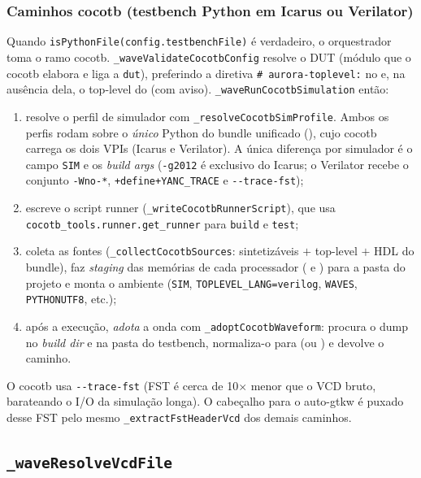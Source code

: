 \subsubsection{Caminhos cocotb (testbench Python em Icarus ou Verilator)}

Quando \lstinline|isPythonFile(config.testbenchFile)| é verdadeiro, o
orquestrador toma o ramo cocotb. \lstinline|_waveValidateCocotbConfig| resolve o
DUT (módulo que o cocotb elabora e liga a \lstinline|dut|), preferindo a
diretiva \lstinline|# aurora-toplevel:| no  e, na ausência dela, o
top-level do  (com aviso). \lstinline|_waveRunCocotbSimulation|
então:

\begin{enumerate}[leftmargin=*]
  \item resolve o perfil de simulador com \lstinline|_resolveCocotbSimProfile|.
    Ambos os perfis rodam sobre o \emph{único} Python do bundle unificado
    (), cujo cocotb carrega
    os dois VPIs (Icarus e Verilator). A única diferença por simulador é o campo
    \lstinline|SIM| e os \emph{build args} (\lstinline|-g2012| é exclusivo do
    Icarus; o Verilator recebe o conjunto \lstinline|-Wno-*|,
    \lstinline|+define+YANC_TRACE| e \lstinline|--trace-fst|);
  \item escreve o script runner (\lstinline|_writeCocotbRunnerScript|), que usa
    \lstinline|cocotb_tools.runner.get_runner| para \lstinline|build| e
    \lstinline|test|;
  \item coleta as fontes (\lstinline|_collectCocotbSources|: sintetizáveis $+$
    top-level $+$ HDL do bundle), faz \emph{staging} das memórias de cada
    processador ( e ) para a pasta do projeto e monta o ambiente (\lstinline|SIM|,
    \lstinline|TOPLEVEL_LANG=verilog|, \lstinline|WAVES|, \lstinline|PYTHONUTF8|,
    etc.);
  \item após a execução, \emph{adota} a onda com \lstinline|_adoptCocotbWaveform|:
    procura o dump no \emph{build dir} e na pasta do testbench, normaliza-o para
     (ou ) e devolve o caminho.
\end{enumerate}

O cocotb usa \lstinline|--trace-fst| (FST é cerca de 10$\times$ menor que o VCD
bruto, barateando o I/O da simulação longa). O cabeçalho para o auto-gtkw é
puxado desse FST pelo mesmo \lstinline|_extractFstHeaderVcd| dos demais
caminhos.

\subsection{\texttt{\_waveResolveVcdFile}}

